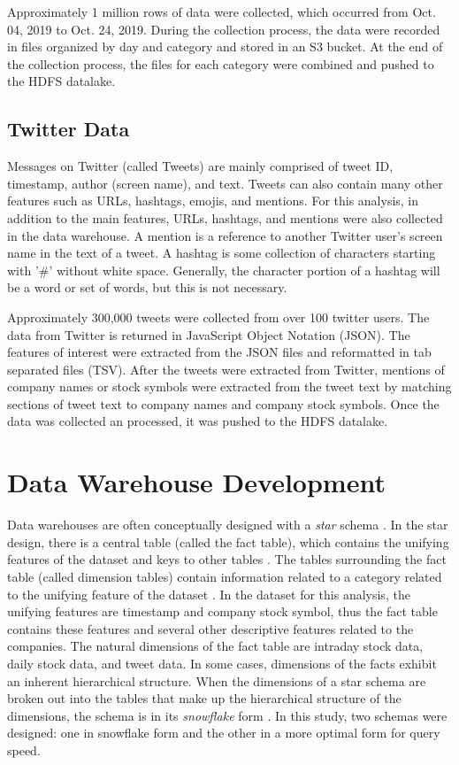 \documentclass[journal]{IEEEtran}
\begin{document}
Approximately 1 million rows of data were collected,
 which occurred from Oct. 04, 2019 to Oct. 24, 2019.
During the collection process, the data were recorded in files
 organized by day and category and stored in an S3 bucket.
At the end of the collection process, the files for each
 category were combined and pushed to the HDFS datalake.

\subsection{Twitter Data}

Messages on Twitter (called Tweets) are mainly comprised of
 tweet ID, timestamp, author (screen name), and text.
Tweets can also contain many other features such as
 URLs, hashtags, emojis,  and mentions.
For this analysis, in addition to the main features,
 URLs, hashtags, and mentions were also collected in the data warehouse.
A mention is a reference to another Twitter user's screen name
 in the text of a tweet.
A hashtag is some collection of characters starting with
 '\#' without white space.
Generally, the character portion of a hashtag will be a word or set of words,
 but this is not necessary.

Approximately 300,000 tweets were collected from over 100 twitter users.
The data from Twitter is returned in JavaScript Object Notation (JSON).
The features of interest were extracted from the JSON files and
 reformatted in tab separated files (TSV).
After the tweets were extracted from Twitter,
 mentions of company names or stock symbols were extracted from the tweet text by
 matching sections of tweet text to company names and company stock symbols.
Once the data was collected an processed, it was pushed to the HDFS datalake.


\section{Data Warehouse Development}

Data warehouses are often conceptually designed with a \textit{star} schema 
 \cite{BuildingtheDWCH11}.
In the star design, there is a central table (called the fact table),
 which contains the unifying features of the dataset and keys to other tables
 \cite{BuildingtheDWCH11}.
The tables surrounding the fact table (called dimension tables) 
 contain information related to a category related to the unifying feature
 of the dataset \cite{BuildingtheDWCH11}.
In the dataset for this analysis, the unifying features are timestamp and
 company stock symbol, thus the fact table contains these features
 and several other descriptive features related to the companies.
The natural dimensions of the fact table are intraday stock data,
 daily stock data, and tweet data.
In some cases, dimensions of the facts exhibit an
 inherent hierarchical structure. 
When the dimensions of a star schema are broken out into the tables
 that make up the hierarchical structure of the dimensions, the schema
 is in its \textit{snowflake} form \cite{BuildingtheDWCH11}.
In this study, two schemas were designed: one in snowflake form and
 the other in a more optimal form for query speed.
\end{document}
